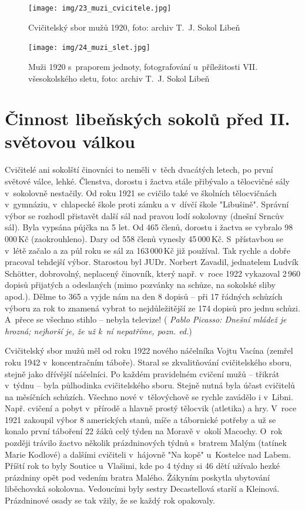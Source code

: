 \documentclass[a5paper, 11pt, twoside]{article}
\newcommand{\pozned}[1]{%
\textit{#1}}
\begin{document}
\begin{figure}[h!]
  \centering 
  \texttt{[image: img/23\_muzi\_cvicitele.jpg]}
  \caption*{Cvičitelský sbor mužů 1920, foto: archiv T.~J. Sokol Libeň}
\end{figure}

\begin{figure}[h!]
  \centering 
  \texttt{[image: img/24\_muzi\_slet.jpg]}
  \caption*{Muži 1920 s~praporem jednoty, fotografování u~příležitosti VII. všesokolského sletu, foto: archiv T.~J. Sokol Libeň}
\end{figure}


\section{Činnost libeňských sokolů před II. světovou
válkou}

Cvičitelé ani sokolští činovníci to neměli v~těch dvacátých letech, po
první světové válce, lehké. Členstva, dorostu i žactva stále přibývalo a
tělocvičné sály v~sokolovně nestačily. Od roku 1921 se cvičilo také ve
školních tělocvičnách v~gymnáziu, v~chlapecké škole proti zámku a
v~dívčí škole "Libušině". Správní výbor se rozhodl přistavět další sál
nad pravou lodí sokolovny (dnešní Srncův sál). Byla vypsána půjčka na 5
let. Od 465 členů, dorostu i žactva se vybralo 98\,000\,Kč (zaokrouhleno).
Dary od 558 členů vynesly 45\,000\,Kč. S~přístavbou se v~létě začalo a za
půl roku se sál za 163\,000\,Kč již používal. Tak rychle a dobře pracoval
tehdejší výbor. Starostou byl JUDr. Norbert Zavadil, jednatelem Ludvík
Schötter, dobrovolný, neplacený činovník, který např. v~roce 1922
vykazoval 2\,960 dopisů přijatých a odeslaných (mimo pozvánky na schůze,
na sokolské sliby apod.). Dělme to 365 a vyjde nám na den 8 dopisů --
při 17 řádných schůzích výboru za rok to znamená vybrat to
nejdůležitější ze 174 dopisů pro jednu schůzi. A~přece se všechno stihlo
-- nebyla televize! (\pozned{Pablo Picasso: Dnešní mládež je hrozná;
nejhorší je, že už k~ní nepatříme, pozn. ed.})

Cvičitelský sbor mužů měl od roku 1922 nového náčelníka Vojtu Vacína
(zemřel roku 1942 v~koncentračním táboře). Staral se zkvalitňování
cvičitelského sboru, stejně jako dřívější náčelníci. Po každém
pravidelném cvičení mužů -- třikrát v~týdnu -- byla půlhodinka
cvičitelského sboru. Stejně nutná byla účast cvičitelů na měsíčních
schůzích. Všechno nové v~tělovýchově se rychle zavádělo i v~Libni. Např.
cvičení a pobyt v~přírodě a hlavně prostý tělocvik (atletika) a hry.
V~roce 1921 zakoupil výbor 8 amerických stanů, míče a tábornické potřeby a
už se konalo první táboření 22 žáků celý týden na Moravě v~okolí
Macochy. O~rok později trávilo žactvo několik prázdninových týdnů
s~bratrem Malým (tatínek Marie Kodlové) a dalšími cvičiteli v~hájovně "Na
kopě" u~Kostelce nad Labem. Příští rok to byly Soutice u~Vlašimi, kde
po 4 týdny si 46 dětí užívalo hezké prázdniny opět pod vedením bratra
Malého. Žákyním poskytla ubytování liběchovská sokolovna. Vedoucími byly
sestry Decastellová starší a Kleinová. Prázdninové osady se tak vžily,
že se každý rok opakovaly.
\end{document}
